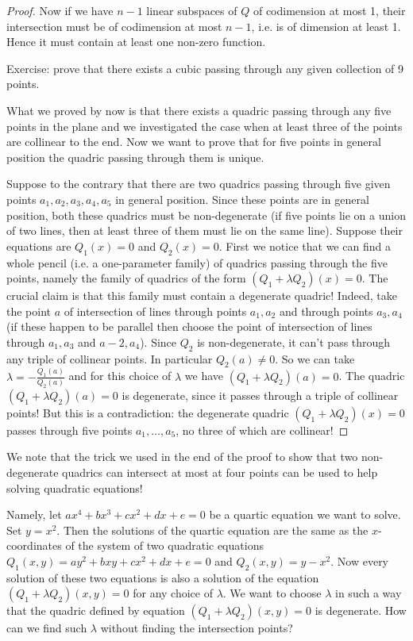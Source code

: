 {{\begin{proof}
Now if we have $n-1$ linear subspaces of $Q$ of codimension at most 1, their intersection must be of codimension at most $n-1$, i.e. is of dimension at least 1. Hence it must contain at least one non-zero function.

Exercise: prove that there exists a cubic passing through any given collection of 9 points.

What we proved by now is that there exists a quadric passing through any five points in the plane and we investigated the case when at least three of the points are collinear to the end. Now we want to prove that for five points in general position the quadric passing through them is unique.

Suppose to the contrary that there are two quadrics passing through five given points $a_1,a_2,a_3,a_4,a_5$ in general position. Since these points are in general position, both these quadrics must be non-degenerate (if five points lie on a union of two lines, then at least three of them must lie on the same line). Suppose their equations are $Q_1(x)=0$ and $Q_2(x)=0$. First we notice that we can find a whole pencil (i.e. a one-parameter family) of quadrics passing through the five points, namely the family of quadrics of the form $(Q_1+\lambda Q_2)(x)=0$. The crucial claim is that this family must contain a degenerate quadric! Indeed, take the point $a$ of intersection of lines through points $a_1,a_2$ and through points $a_3,a_4$ (if these happen to be parallel then choose the point of intersection of lines through $a_1,a_3$ and $a-2,a_4$). Since $Q_2$ is non-degenerate, it can't pass through any triple of collinear points. In particular $Q_2(a)\neq 0$. So we can take $\lambda=-\frac{Q_1(a)}{Q_2(a)}$ and for this choice of $\lambda$ we have $(Q_1+\lambda Q_2)(a)=0$. The quadric $(Q_1+\lambda Q_2)(a)=0$ is degenerate, since it passes through a triple of collinear points! But this is a contradiction: the degenerate quadric $(Q_1+\lambda Q_2)(x)=0$ passes through five points $a_1,\ldots,a_5$, no three of which are collinear!

\end{proof}

We note that the trick we used in the end of the proof to show that two non-degenerate quadrics can intersect at most at four points can be used to help solving quadratic equations!

Namely, let $ax^4+bx^3+cx^2+dx+e=0$ be a quartic equation we want to solve. Set $y=x^2$. Then the solutions of the quartic equation are the same as the $x$-coordinates of the system of two quadratic equations $Q_1(x,y)=ay^2+bxy+cx^2+dx+e=0$ and $Q_2(x,y)=y-x^2$. Now every solution of these two equations is also a solution of the equation $(Q_1+\lambda Q_2) (x,y)=0$ for any choice of $\lambda$. We want to choose $\lambda$ in such a way that the quadric defined by equation $(Q_1+\lambda Q_2) (x,y)=0$ is degenerate. How can we find such $\lambda$ without finding the intersection points?

}}
